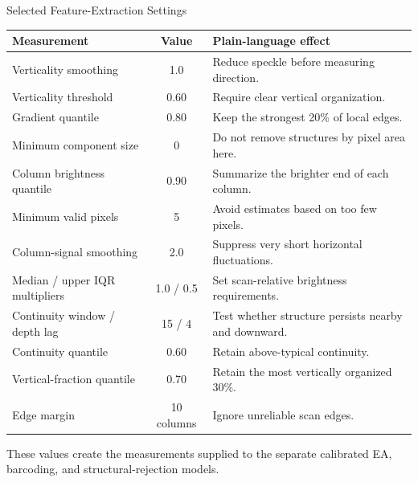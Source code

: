 \documentclass[aspectratio=169]{beamer}
\begin{document}
\begin{frame}{Selected Feature-Extraction Settings}

\scriptsize
\begin{table}
\centering
\begin{tabular}{lcl}
\toprule
Measurement & Value & Plain-language effect \\
\midrule
Verticality smoothing & 1.0 & Reduce speckle before measuring direction. \\
Verticality threshold & 0.60 & Require clear vertical organization. \\
Gradient quantile & 0.80 & Keep the strongest 20\% of local edges. \\
Minimum component size & 0 & Do not remove structures by pixel area here. \\
Column brightness quantile & 0.90 & Summarize the brighter end of each column. \\
Minimum valid pixels & 5 & Avoid estimates based on too few pixels. \\
Column-signal smoothing & 2.0 & Suppress very short horizontal fluctuations. \\
Median / upper IQR multipliers & 1.0 / 0.5 & Set scan-relative brightness requirements. \\
Continuity window / depth lag & 15 / 4 & Test whether structure persists nearby and downward. \\
Continuity quantile & 0.60 & Retain above-typical continuity. \\
Vertical-fraction quantile & 0.70 & Retain the most vertically organized 30\%. \\
Edge margin & 10 columns & Ignore unreliable scan edges. \\
\bottomrule
\end{tabular}
\end{table}

These values create the measurements supplied to the separate calibrated EA,
barcoding, and structural-rejection models.

\end{frame}
\end{document}
